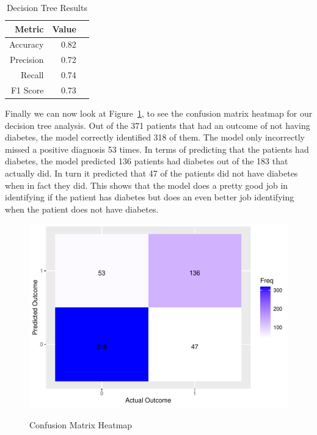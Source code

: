 \documentclass[12pt]{article}
\begin{document}
\begin{table}[ht]
  \centering
  \caption{Decision Tree Results}
  \label{tab:dtr} 
  \begin{tabular}{rrr}
    \toprule
    Metric & Value\\
    \midrule
    Accuracy & 0.82\\
    Precision & 0.72\\
    Recall & 0.74\\
    F1 Score & 0.73\\
    \bottomrule
  \end{tabular}
\end{table}

Finally we can now look at Figure~\ref{fig:Heatmap}, to see the confusion matrix heatmap for our decision tree analysis. Out of the 371 patients that had an outcome
of not having diabetes, the model correctly identified 318 of them. The model only incorrectly missed a positive diagnosis 53 times. 
In terms of predicting that the patients had diabetes, the model predicted 136 patients had diabetes out of the 183 that actually did. In turn it predicted that 47 of the
patients did not have diabetes when in fact they did. This shows that the model does a pretty good job in identifying if the patient has diabetes but does an even better job
identifying when the patient does not have diabetes.  

\begin{figure}[tbp]
  \centering
  \caption{Confusion Matrix Heatmap}
  \includegraphics[width=\textwidth]{Confusion Matrix Heatmap.pdf}
  \label{fig:Heatmap}
\end{figure}
\end{document}
